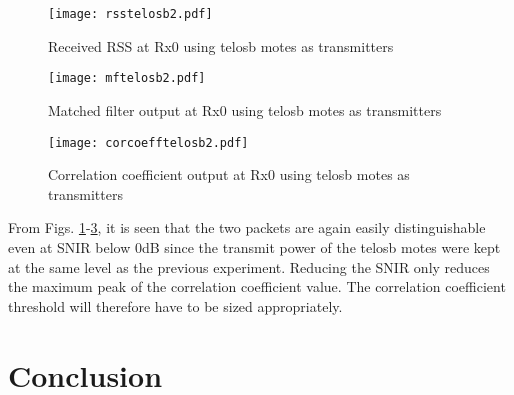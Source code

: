 \documentclass[journal]{IEEEtran}
\begin{document}
\begin{figure}[htb]
\begin{center}
	\texttt{[image: rsstelosb2.pdf]} 
\caption{Received RSS at Rx0 using telosb motes as transmitters}
\label{fig:rsstelosb2}
\end{center}
\end{figure}

\begin{figure}[htb]
\begin{center}
	\texttt{[image: mftelosb2.pdf]} 
\caption{Matched filter output at Rx0 using telosb motes as transmitters}
\label{fig:mftelosb2}
\end{center}
\end{figure}

\begin{figure}[htb]
\begin{center}
	\texttt{[image: corcoefftelosb2.pdf]} 
\caption{Correlation coefficient output at Rx0 using telosb motes as transmitters}
\label{fig:corcoefftelosb2}
\end{center}
\end{figure}

From Figs. \ref{fig:rsstelosb2}-\ref{fig:corcoefftelosb2}, it is seen that the two packets are again easily distinguishable even at SNIR below 0dB since the transmit power of the telosb motes were kept at the same level as the previous experiment. Reducing the SNIR only reduces the maximum peak of the correlation coefficient value. The correlation coefficient threshold will therefore have to be sized appropriately.

\section{Conclusion} \label{sec:conc}




\end{document}

